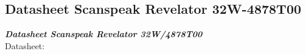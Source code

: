 


\subsection{Datasheet Scanspeak Revelator 32W-4878T00}
\label{datasheet_32W_4878T00}
\emph{\textbf{Datasheet Scanspeak Revelator 32W/4878T00}}\\
\vspace{5pt}
Datasheet:	\\

